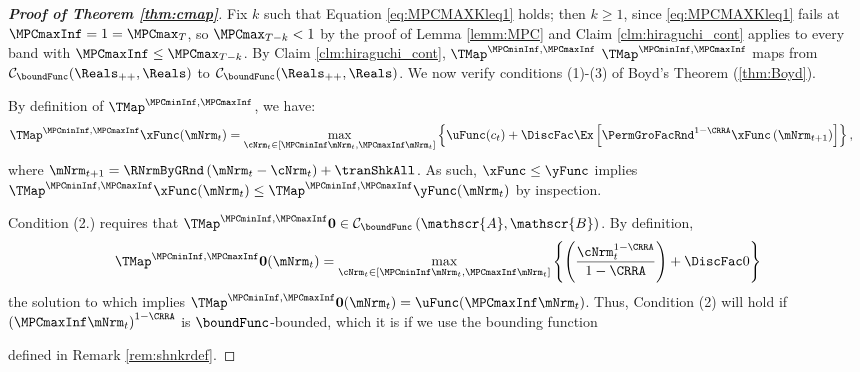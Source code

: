 \documentclass[\econtexRoot/BufferStockTheory]{subfiles}
\begin{document}
\begin{proof}[\textbf{Proof of Theorem \ref{thm:cmap}}]
Fix $k$ such that Equation \eqref{eq:MPCMAXKleq1} holds; then $k\geq 1$, since \eqref{eq:MPCMAXKleq1} fails at $\MPCmaxInf=1=\MPCmax_{T}$, so $\MPCmax_{T-k}<1$ by the proof of Lemma \ref{lemm:MPC} and Claim \ref{clm:hiraguchi_cont} applies to every band with $\MPCmaxInf\leq\MPCmax_{T-k}$.
By Claim \ref{clm:hiraguchi_cont}, $\TMap^{\MPCminInf, \MPCmaxInf}$  $\TMap^{\MPCminInf, \MPCmaxInf}$ maps from $\mathcal{C}_{\boundFunc}(\Reals_{++},\Reals)$ to $\mathcal{C}_{\boundFunc}(\Reals_{++},\Reals)$.
We now verify conditions (1)-(3) of Boyd's Theorem (\ref{thm:Boyd}).


 By definition of $\TMap^{\MPCminInf, \MPCmaxInf}$, we have: 
\begin{equation}\begin{gathered}\begin{aligned}
  \TMap^{\MPCminInf, \MPCmaxInf}{\mathfrak{\xFunc}}(\mNrm_{t}) & = \underset{\cNrm_{t} \in
                                            [\MPCminInf \mNrm_{t}, \MPCmaxInf \mNrm_{t}]
                                            }\max \left\{
                                            \uFunc(c_{t})+\DiscFac \Ex\left[ {\PermGroFacRnd}^{1-\CRRA }{\mathfrak{\xFunc}}
                                            \left( {\mNrm}_{t+1}\right) \right] \right\},    \label{eq:condition1}
\end{aligned}\end{gathered}\end{equation}%
%
where ${\mNrm}_{t+1} = \RNrmByGRnd\left(\mNrm_{t} - \cNrm_{t}\right) + \tranShkAll$.
As such, ${\mathfrak{\xFunc}} \leq {\mathfrak{\yFunc}}$ implies $\TMap^{\MPCminInf, \MPCmaxInf}{\mathfrak{\xFunc}}(\mNrm_{t}) \leq \TMap^{\MPCminInf, \MPCmaxInf}{\mathfrak{\yFunc}} (\mNrm_{t})$ by inspection.

  Condition (2.) requires that $\TMap^{\MPCminInf, \MPCmaxInf}\mathbf{0}\in \mathcal{C}_{\boundFunc}\left(\mathscr{A},\mathscr{B}\right)$.
By definition,
\begin{equation*}
  \TMap^{\MPCminInf, \MPCmaxInf} \mathbf{0}(\mNrm_{t}) = \max_{\cNrm_{t} \in
    [\MPCminInf \mNrm_{t}, \MPCmaxInf \mNrm_{t}]
  }\left\{ \left( \frac{\cNrm_{t}^{1-\CRRA }}{1-\CRRA }\right) +\DiscFac 0\right\}
\end{equation*}
the solution to which implies
$\TMap^{\MPCminInf, \MPCmaxInf} \mathbf{0}(\mNrm_{t}) = \uFunc(\MPCmaxInf \mNrm_{t})$.
Thus, Condition (2)
will hold if ${(\MPCmaxInf \mNrm_{t})}^{1-\CRRA}$ is $\boundFunc$-bounded, which it is if we use the
bounding function

defined in Remark \ref{rem:shnkrdef}.



\end{proof}
\end{document}
